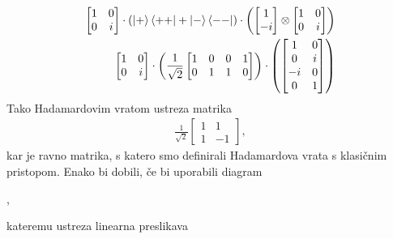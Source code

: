 \documentclass[mat1]{fmfdelo}
\begin{document}
\begin{align*}
    \begin{bmatrix}
        1&0\\0&i
    \end{bmatrix}\cdot \left(\ket{+}\bra{++}+\ket{-}\bra{--}\right)\cdot \left(\begin{bmatrix}
        1\\-i
    \end{bmatrix}\otimes\begin{bmatrix}
        1&0\\0&i
    \end{bmatrix}\right) \\
    \begin{bmatrix}
        1&0\\0&i
    \end{bmatrix}\cdot\left( \frac{1}{\sqrt2}\begin{bmatrix}
        1&0&0&1\\
        0&1&1&0
    \end{bmatrix}\right) \cdot
    \left(\begin{bmatrix}
        1 &0\\
        0 &i\\
        -i&0\\
        0 &1
    \end{bmatrix}
    \right)
\end{align*}
Tako Hadamardovim vratom ustreza matrika
\begin{align*}
    \frac{1}{\sqrt2}\begin{bmatrix}
        1&1\\
        1&-1
    \end{bmatrix},
\end{align*}
kar je ravno matrika, s katero smo definirali Hadamardova vrata s klasičnim pristopom. Enako bi dobili, če bi uporabili diagram 
\begin{center}
    ,
\end{center}
kateremu ustreza linearna preslikava 
\end{document}

